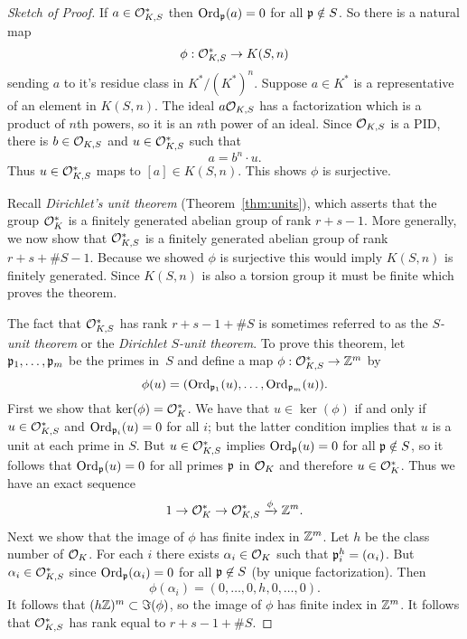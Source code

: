 \begin{proof}[Sketch of Proof]
  If $a \in \mathcal{O}_{K,S}^*$ then $\operatorname{Ord}_{\mathfrak{p}}(a)=0$ for all $\mathfrak{p} \notin S$.
  So there is a natural map
  \[
    \phi: \mathcal{O}_{K,S}^* \to K(S,n)
  \]
  sending $a$ to it's residue class in $K^*/(K^*)^n$.
  Suppose $a\in K^*$ is a representative of an element in $K(S,n)$.
  The ideal $a \mathcal{O}_{K,S}$ has a factorization which is a product of $n$th
  powers, so it is an $n$th power of an ideal. Since $\mathcal{O}_{K,S}$ is a PID,
  there is $b\in \mathcal{O}_{K,S}$ and $u\in \mathcal{O}_{K,S}^*$ such that
  \[
    a = b^n \cdot u.
  \]
  Thus $u\in \mathcal{O}_{K,S}^*$ maps to $[a] \in K(S,n)$. This shows $\phi$
  is surjective.

  Recall {\em Dirichlet's unit theorem} (Theorem~\ref{thm:units}),
  which asserts that the group $\mathcal{O}_K^*$ is a finitely generated
  abelian group of rank $r+s-1$.  More generally, we
  now show that $\mathcal{O}_{K,S}^*$ is a finitely generated abelian group of
  rank $r+s+\#S -1$.
  Because we showed $\phi$ is surjective this would imply $K(S,n)$ is finitely generated.
  Since $K(S,n)$ is also a torsion group it must be finite which proves the theorem.

  The fact that $\mathcal{O}_{K,S}^*$ has rank $r+s-1 + \#S$ is sometimes
  referred to as the \emph{$S$-unit theorem} or the
  \emph{Dirichlet $S$-unit theorem}. To prove this theorem,
  let $\mathfrak{p}_1,\ldots, \mathfrak{p}_m$ be the primes in~$S$
  and define a map $\phi: \mathcal{O}_{K,S}^* \to \mathbb{Z}^m$ by
  \[
    \phi(u) = (\operatorname{Ord}_{\mathfrak{p}_1}(u), \ldots, \operatorname{Ord}_{\mathfrak{p}_m}(u)).
  \]
  First we show that $\ker(\phi) = \mathcal{O}_K^*$.  We have that
  $u\in \ker(\phi)$ if and only if $u \in \mathcal{O}_{K,S}^*$
  and $\operatorname{Ord}_{\mathfrak{p}_i}(u) = 0$ for all $i$; but the latter condition
  implies that $u$ is a unit at each prime in $S$. But
  $u\in \mathcal{O}_{K,S}^*$ implies $\operatorname{Ord}_{\mathfrak{p}}(u) = 0$ for all $\mathfrak{p}\notin S$,
  so it follows that $\operatorname{Ord}_{\mathfrak{p}}(u)=0$ for all primes $\mathfrak{p}$ in $\mathcal{O}_K$
  and therefore $u\in \mathcal{O}_K^*$.
  Thus we have an exact sequence
  \[
    1 \to \mathcal{O}_K^* \to \mathcal{O}_{K,S}^* \xrightarrow{\phi} \mathbb{Z}^m.
  \]
  Next we show that the image of $\phi$ has finite index
  in $\mathbb{Z}^m$.  Let $h$ be the class number of $\mathcal{O}_K$.
  For each $i$ there exists $\alpha_i \in \mathcal{O}_K$
  such that $\mathfrak{p}_i^h = (\alpha_i)$.  But $\alpha_i \in \mathcal{O}_{K,S}^*$
  since $\operatorname{Ord}_{\mathfrak{p}}(\alpha_i) = 0$ for all $\mathfrak{p}\not\in S$ (by unique
  factorization). Then
  \[
    \phi(\alpha_i) = (0,\ldots,0,h,0,\ldots,0).
  \]
  It follows that $(h\mathbb{Z})^m \subset \Im(\phi)$, so
  the image of $\phi$ has finite index in $\mathbb{Z}^m$.  It follows
  that $\mathcal{O}_{K,S}^*$ has rank equal to $r+s-1+\#S$.
\end{proof}

